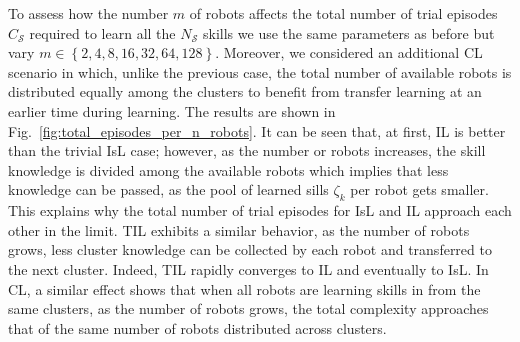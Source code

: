 \documentclass[12pt]{article}
\begin{document}
To assess how the number $m$ of robots affects the total number of trial episodes $C_\mathcal{S}$ required to learn all the $N_\mathcal{S}$ skills we use the same parameters as before but vary $m \in \left \lbrace 2,4,8,16,32,64,128\right \rbrace$. Moreover, we considered an additional CL scenario in which, unlike the previous case, the total number of available robots is distributed equally among the clusters to benefit from transfer learning at an earlier time during learning. The results are shown in Fig.~\ref{fig:total_episodes_per_n_robots}. It can be seen that, at first, IL is better than the trivial IsL case; however, as the number or robots increases, the skill knowledge is divided among the available robots which implies that less knowledge can be passed, as the pool of learned sills $\zeta_k$ per robot gets smaller. This explains why the total number of trial episodes for IsL and IL approach each other in the limit. TIL exhibits a similar behavior, as the number of robots grows, less cluster knowledge can be collected by each robot and transferred to the next cluster. Indeed, TIL rapidly converges to IL and eventually to IsL. In CL, a similar effect shows that when all robots are learning skills in from the same clusters, as the number of robots grows, the total complexity approaches that of the same number of robots distributed across clusters.
\end{document}
